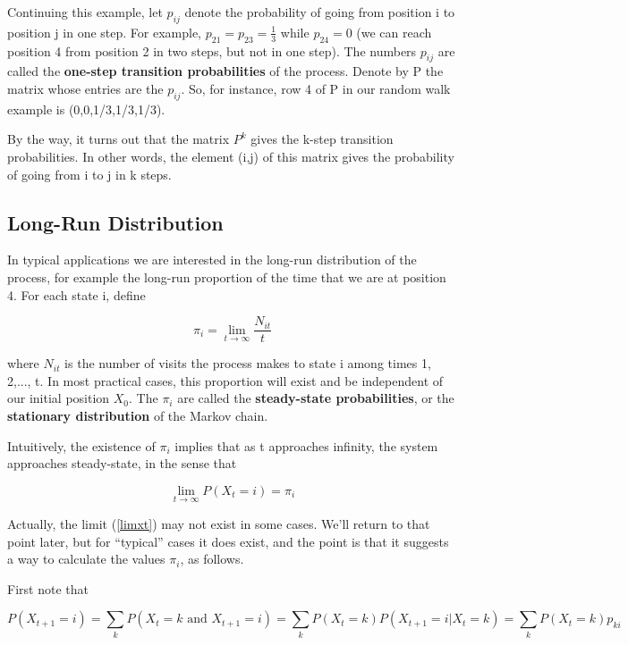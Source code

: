 \documentclass[11pt]{article}
\begin{document}
Continuing this example, let $p_{ij}$ denote the probability of going
from position i to position j in one step. For example,
$p_{21}=p_{23}=\frac{1}{3}$ while $p_{24}=0$ (we can reach position 4
from position 2 in two steps, but not in one step). The numbers $p_{ij}$
are called the \textbf{one-step transition probabilities} of the
process. Denote by P the matrix whose entries are the $p_{ij}$.  So, for
instance, row 4 of P in our random walk example is (0,0,1/3,1/3,1/3).

By the way, it turns out that the matrix $P^{k}$ gives the k-step
transition probabilities. In other words, the element (i,j) of this
matrix gives the probability of going from i to j in k steps.

\subsection{Long-Run Distribution}

In typical applications we are interested in the long-run distribution of the
process, for example the long-run proportion of the time that we are at position
4. For each state i, define


\begin{equation}
\label{limnt}
\pi_{i}=\lim_{t\rightarrow \infty }\frac{N_{it}}{t}
\end{equation}

where $N_{it}$ is the number of visits the process makes to state i
among times 1, 2,..., t. In most practical cases, this proportion will
exist and be independent of our initial position $X_{0}$.  The $\pi_i$
are called the {\bf steady-state probabilities}, or the {\bf stationary
distribution} of the Markov chain.

Intuitively, the existence of $\pi_{i}$ implies that as t approaches
infinity, the system approaches steady-state, in the sense that

\begin{equation}
\label{limxt}
\lim_{t\rightarrow \infty }P(X_{t}=i)=\pi_{i}
\end{equation}

Actually, the limit (\ref{limxt}) may not exist in some cases.  We'll
return to that point later, but for ``typical'' cases it does exist, and
the point is that it suggests a way to calculate the values $\pi_{i}$,
as follows.

First note that

\begin{equation}
P(X_{t+1}=i)
= \sum_{k} P(X_{t}=k \textrm{ and } X_{t+1}=i)
= \sum_{k} P(X_{t}=k) P(X_{t+1}=i | X_t = k)
= \sum_{k} P(X_{t}=k)p_{ki}
\end{equation}
\end{document}
